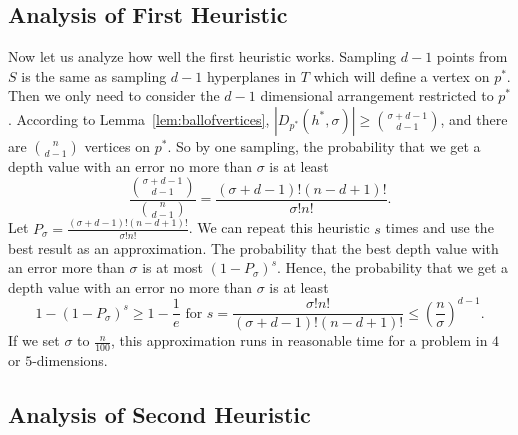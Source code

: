 \documentclass [letterpaper] {article}
\begin{document}

\subsection{Analysis of First Heuristic}
Now let us analyze how well the first heuristic works. Sampling $d - 1$ points from $S$ is the same as sampling $d - 1$ hyperplanes in $T$ which will define a vertex on $p^{*}$. Then we only need to consider the $d-1$ dimensional arrangement restricted to $p^{*}$. According to Lemma~\ref{lem:ballofvertices}, $|D_{p^{*}}(h^{*},\sigma)| \geq \binom{\sigma+d-1}{d-1}$, and there are $\binom{n}{d-1}$ vertices on $p^{*}$. So by one sampling, the probability that we get a depth value with an error no more than $\sigma$ is at least
\begin{equation}
  \label{eq:prbvertex}
  \frac{\binom{\sigma+d-1}{d-1}}{\binom{n}{d-1}} = \frac{(\sigma+d-1)!(n-d+1)!}{\sigma!n!} .%
\end{equation}
Let $P_{\sigma} = \frac{(\sigma+d-1)!(n-d+1)!}{\sigma!n!}$. We can repeat this heuristic $s$ times and use the best result as an approximation. The probability that the best depth value with an error more than $\sigma$ is at most $(1 - P_{\sigma})^{s}$. Hence, the probability that we get a depth value with an error no more than $\sigma$ is at least
\begin{equation}
  \label{eq:prbappr}
  1 - (1 - P_{\sigma})^{s} \geq 1 - \frac{1}{e} \textrm{ for } s = \frac{\sigma!n!}{(\sigma+d-1)!(n-d+1)!} \leq \left( \frac{n}{\sigma} \right)^{d-1} .
\end{equation}
If we set $\sigma$ to $\frac{n}{100}$, this approximation runs in reasonable time for a problem in $4$ or $5$-dimensions.

\subsection{Analysis of Second Heuristic}
\end{document}
